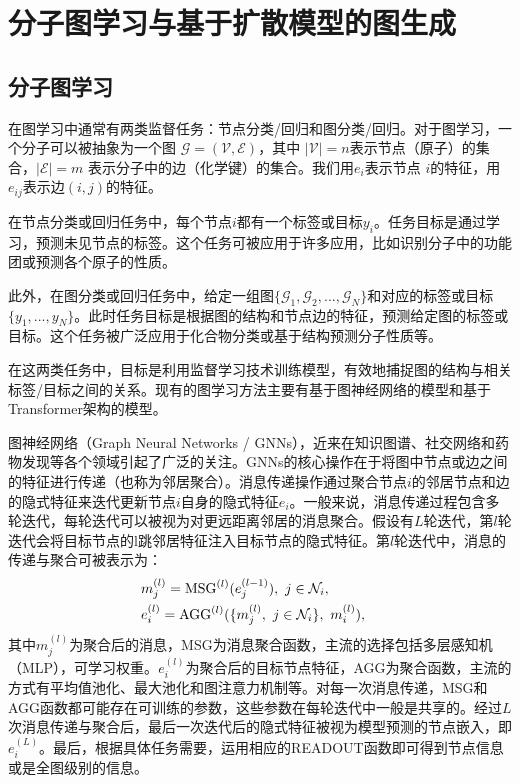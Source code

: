 \chapter{分子图学习与基于扩散模型的图生成}
\label{chap:diffusion-based_molgen}

\section{分子图学习}
在图学习中通常有两类监督任务：节点分类/回归和图分类/回归。对于图学习，一个分子可以被抽象为一个图 $\mathcal{G} = (\mathcal{V}, \mathcal{E})$，其中 $|\mathcal{V}| = n$表示节点（原子）的集合，$|\mathcal{E}| = m$ 表示分子中的边（化学键）的集合。我们用$e_i$表示节点 $i$的特征，用$e_{ij}$表示边$(i, j)$的特征。

在节点分类或回归任务中，每个节点$i$都有一个标签或目标$y_i$。任务目标是通过学习，预测未见节点的标签。这个任务可被应用于许多应用，比如识别分子中的功能团或预测各个原子的性质。

此外，在图分类或回归任务中，给定一组图$\{ \mathcal{G}_1, \mathcal{G}_2, ..., \mathcal{G}_N \}$和对应的标签或目标 $\{ y_1, ..., y_N \}$。此时任务目标是根据图的结构和节点边的特征，预测给定图的标签或目标。这个任务被广泛应用于化合物分类或基于结构预测分子性质等。

在这两类任务中，目标是利用监督学习技术训练模型，有效地捕捉图的结构与相关标签/目标之间的关系。现有的图学习方法主要有基于图神经网络的模型和基于Transformer架构的模型。

图神经网络（Graph Neural Networks / GNNs），近来在知识图谱、社交网络和药物发现等各个领域引起了广泛的关注。GNNs的核心操作在于将图中节点或边之间的特征进行传递（也称为邻居聚合）。消息传递操作通过聚合节点$i$的邻居节点和边的隐式特征来迭代更新节点$i$自身的隐式特征$e_i$。一般来说，消息传递过程包含多轮迭代，每轮迭代可以被视为对更远距离邻居的消息聚合。假设有$L$轮迭代，第$l$轮迭代会将目标节点的l跳邻居特征注入目标节点的隐式特征。第$l$轮迭代中，消息的传递与聚合可被表示为：
\begin{eqnarray}
    &m_j^{(l)} = {\rm MSG}^{(l)}(e_j^{(l-1)}), \ j \in \mathcal{N}_i, & \\
    &e_i^{(l)} = {\rm AGG}^{(l)}(\{ m_j^{(l)}, \ j \in \mathcal{N}_i \}, \ m_i^{(l)} ), &
\end{eqnarray}
其中$m_j^{(l)}$为聚合后的消息，MSG为消息聚合函数，主流的选择包括多层感知机（MLP），可学习权重。$e_i^{(l)}$为聚合后的目标节点特征，AGG为聚合函数，主流的方式有平均值池化、最大池化和图注意力机制等。对每一次消息传递，MSG和AGG函数都可能存在可训练的参数，这些参数在每轮迭代中一般是共享的。经过$L$次消息传递与聚合后，最后一次迭代后的隐式特征被视为模型预测的节点嵌入，即$e_i^{(L)}$。最后，根据具体任务需要，运用相应的READOUT函数即可得到节点信息或是全图级别的信息。

